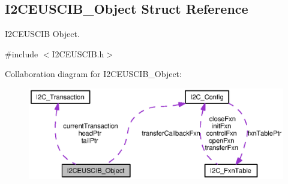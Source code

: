 \subsection{I2\-C\-E\-U\-S\-C\-I\-B\-\_\-\-Object Struct Reference}
\label{struct_i2_c_e_u_s_c_i_b___object}


I2\-C\-E\-U\-S\-C\-I\-B Object.  




{\ttfamily \#include $<$I2\-C\-E\-U\-S\-C\-I\-B.\-h$>$}



Collaboration diagram for I2\-C\-E\-U\-S\-C\-I\-B\-\_\-\-Object\-:
\nopagebreak
\begin{figure}[H]
\begin{center}
\leavevmode
\includegraphics[width=350pt]{struct_i2_c_e_u_s_c_i_b___object__coll__graph}
\end{center}
\end{figure}
